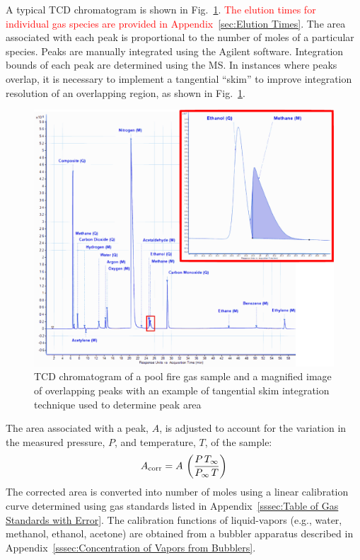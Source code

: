 \documentclass[12pt]{article}
\begin{document}
A typical TCD chromatogram is shown in Fig.~\ref{fig:Chromatogram}. \textcolor{red}{The elution times for individual gas species are provided in Appendix~\ref{sec:Elution Times}}. The area associated with each peak is proportional to the number of moles of a particular species. Peaks are manually integrated using the Agilent software. Integration bounds of each peak are determined using the MS. In instances where peaks overlap, it is necessary to implement a tangential ``skim'' to improve integration resolution of an overlapping region, as shown in Fig.~\ref{fig:Chromatogram}.

\begin{figure}[h!]
	\centering
\includegraphics[width=\textwidth,keepaspectratio]{Chromatogram.png}
	\caption[Chromatogram of a pool fire gas sample]{TCD chromatogram of a pool fire gas sample and a magnified image of overlapping peaks with an example of tangential skim integration technique used to determine peak area}
	\label{fig:Chromatogram}
\end{figure}

The area associated with a peak, $A$, is adjusted to account for the variation in the measured pressure, $P$, and temperature, $T$, of the sample:
\begin{equation}\label{eq:Area_corrected}
	A_{\rm corr} = A \, \left(\frac{P \, T_\infty}{P_\infty \, T} \right)
\end{equation}
The corrected area is converted into number of moles using a linear calibration curve determined using gas standards listed in Appendix~\ref{sssec:Table of Gas Standards with Error}. The calibration functions of liquid-vapors (e.g., water, methanol, ethanol, acetone) are obtained from a bubbler apparatus described in Appendix~\ref{sssec:Concentration of Vapors from Bubblers}.
\end{document}
